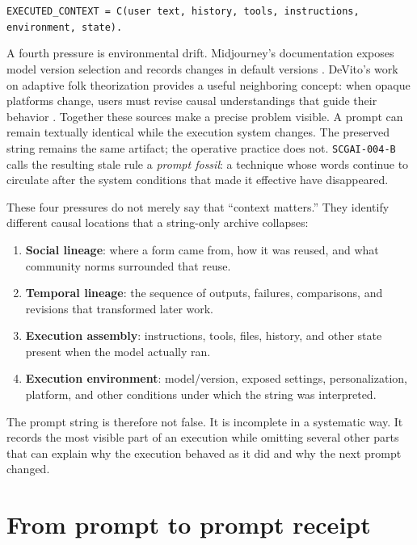 \documentclass[11pt]{article}
\newcommand{\zettel}[1]{\texttt{#1}}
\begin{document}
\begin{center}
\texttt{EXECUTED\_CONTEXT = C(user text, history, tools, instructions, environment, state).}
\end{center}

A fourth pressure is environmental drift. Midjourney's documentation exposes model version selection and records changes in default versions \cite{midjourney_version}. DeVito's work on adaptive folk theorization provides a useful neighboring concept: when opaque platforms change, users must revise causal understandings that guide their behavior \cite{devito2021adaptive}. Together these sources make a precise problem visible. A prompt can remain textually identical while the execution system changes. The preserved string remains the same artifact; the operative practice does not. \zettel{SCGAI-004-B} calls the resulting stale rule a \emph{prompt fossil}: a technique whose words continue to circulate after the system conditions that made it effective have disappeared.

These four pressures do not merely say that ``context matters.'' They identify different causal locations that a string-only archive collapses:

\begin{enumerate}[leftmargin=1.6em]
\item \textbf{Social lineage}: where a form came from, how it was reused, and what community norms surrounded that reuse.
\item \textbf{Temporal lineage}: the sequence of outputs, failures, comparisons, and revisions that transformed later work.
\item \textbf{Execution assembly}: instructions, tools, files, history, and other state present when the model actually ran.
\item \textbf{Execution environment}: model/version, exposed settings, personalization, platform, and other conditions under which the string was interpreted.
\end{enumerate}

The prompt string is therefore not false. It is incomplete in a systematic way. It records the most visible part of an execution while omitting several other parts that can explain why the execution behaved as it did and why the next prompt changed.

\section{From prompt to prompt receipt}
\end{document}
